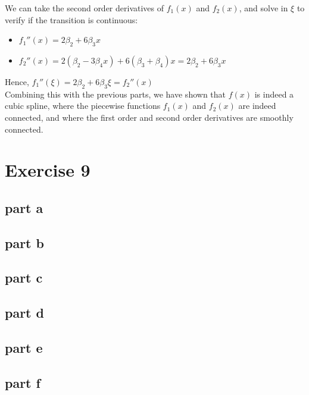 \documentclass[11pt, a4paper]{article}
\begin{document}
We can take the second order derivatives of $f_1(x)$ and $f_2(x)$,
and solve in $\xi$ to verify if the transition is continuous:

\begin{itemize}
\item $f_1''(x) = 2\beta_2 + 6\beta_3 x$
\item $f_2''(x) = 2(\beta_2 - 3\beta_4 x) + 6(\beta_3 + \beta_4) x = 2\beta_2 + 6\beta_3 x$
\end{itemize}

Hence, $f_1''(\xi) = 2\beta_2 + 6\beta_3 \xi=f_2''(x)$ \\

Combining this with the previous parts, we have shown that $f(x)$ is
indeed a cubic spline, where the piecewise functions $f_1(x)$ and
$f_2(x)$ are indeed connected, and where the first order and second
order derivatives are smoothly connected.
\section{Exercise 9}
\label{sec-2}
\subsection{part a}
\label{sec-2-1}
\subsection{part b}
\label{sec-2-2}
\subsection{part c}
\label{sec-2-3}
\subsection{part d}
\label{sec-2-4}
\subsection{part e}
\label{sec-2-5}
\subsection{part f}
\label{sec-2-6}
\end{document}
